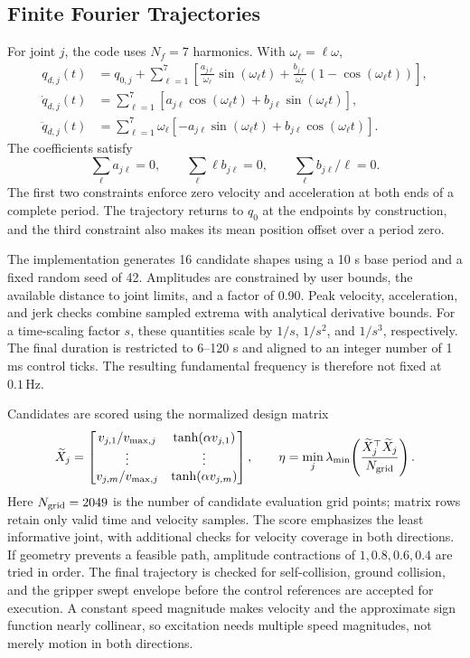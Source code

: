 \documentclass[11pt,a4paper]{report}
\begin{document}
\subsection{Finite Fourier Trajectories}
For joint $j$, the code uses $N_f=7$ harmonics. With $\omega_\ell=\ell\omega$,
\begin{align}
 q_{d,j}(t)&=q_{0,j}+\sum_{\ell=1}^{7}
 \left[\frac{a_{j\ell}}{\omega_\ell}\sin(\omega_\ell t)
 +\frac{b_{j\ell}}{\omega_\ell}(1-\cos(\omega_\ell t))\right],\\
 \dot q_{d,j}(t)&=\sum_{\ell=1}^{7}
 [a_{j\ell}\cos(\omega_\ell t)+b_{j\ell}\sin(\omega_\ell t)],\\
 \ddot q_{d,j}(t)&=\sum_{\ell=1}^{7}\omega_\ell
 [-a_{j\ell}\sin(\omega_\ell t)+b_{j\ell}\cos(\omega_\ell t)].
\end{align}
The coefficients satisfy
\begin{equation}
 \sum_\ell a_{j\ell}=0,\qquad
 \sum_\ell\ell b_{j\ell}=0,\qquad
 \sum_\ell b_{j\ell}/\ell=0.
\end{equation}
The first two constraints enforce zero velocity and acceleration at both ends of a complete period. The trajectory returns to $q_0$ at the endpoints by construction, and the third constraint also makes its mean position offset over a period zero.

The implementation generates 16 candidate shapes using a 10 s base period and a fixed random seed of 42. Amplitudes are constrained by user bounds, the available distance to joint limits, and a factor of 0.90. Peak velocity, acceleration, and jerk checks combine sampled extrema with analytical derivative bounds. For a time-scaling factor $s$, these quantities scale by $1/s$, $1/s^2$, and $1/s^3$, respectively. The final duration is restricted to 6--120 s and aligned to an integer number of 1 ms control ticks. The resulting fundamental frequency is therefore not fixed at $0.1\,\mathrm{Hz}$.

Candidates are scored using the normalized design matrix
\begin{equation}
 \widetilde X_j=\begin{bmatrix}
 v_{j,1}/v_{\max,j}&\tanh(\alpha v_{j,1})\\
 \vdots&\vdots\\
 v_{j,m}/v_{\max,j}&\tanh(\alpha v_{j,m})
 \end{bmatrix},\qquad
 \eta=\min_j\lambda_{\min}\!\left(
 \frac{\widetilde X_j^\top\widetilde X_j}{N_{\rm grid}}\right).
\end{equation}
Here $N_{\rm grid}=2049$ is the number of candidate evaluation grid points; matrix rows retain only valid time and velocity samples. The score emphasizes the least informative joint, with additional checks for velocity coverage in both directions. If geometry prevents a feasible path, amplitude contractions of $1,0.8,0.6,0.4$ are tried in order. The final trajectory is checked for self-collision, ground collision, and the gripper swept envelope before the control references are accepted for execution. A constant speed magnitude makes velocity and the approximate sign function nearly collinear, so excitation needs multiple speed magnitudes, not merely motion in both directions.
\end{document}
